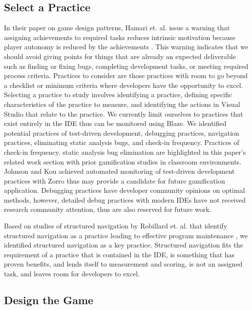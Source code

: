 \documentclass{sig-alternate}
\begin{document}
\subsection{Select a Practice}
In their paper on game design patterns, Hamari et. al. issue a warning that assigning achievements to required tasks reduces intrinsic motivation because player autonomy is reduced by the achievements \cite{wbsnipes:Hamari2011Framework} .  This warning indicates that we should avoid giving points for things that are already an expected deliverable such as finding or fixing bugs, completing development tasks, or meeting required process criteria.  
Practices to consider are those practices with room to go beyond a checklist or minimum criteria where developers have the opportunity to excel.
Selecting a practice to study involves identifying a practice, defining specific characteristics of the practice to measure, and identifying the actions in Visual Studio that relate to the practice.  We currently limit ourselves to practices that exist entirely in the IDE thus can be monitored using Blaze.  We identified potential practices of test-driven development, debugging practices, navigation practices,  eliminating static analysis bugs, and check-in frequency.  
Practices of check-in frequency, static analysis bug elimination are highlighted in this paper's related work section with prior gamification studies in classroom environments.  Johnson and Kou achieved automated monitoring of test-driven development practices with Zorro thus may provide a candidate for future gamification application.   
Debugging practices have developer community opinions on optimal methods, however, detailed debug practices with modern IDEs have not received research community attention, thus are also reserved for future work.  

Based on studies of structured navigation by Robillard et. al. that identify structured navigation as a practice leading to effective program maintenance  \cite{wbsnipes:Robillard2004How}, we identified structured navigation as a key practice.   Structured navigation fits the requirement of a practice that is contained in the IDE, is something that has proven benefits, and lends itself to measurement and scoring, is not an assigned task, and leaves room for developers to excel.  

\subsection{Design the Game}
\end{document}
